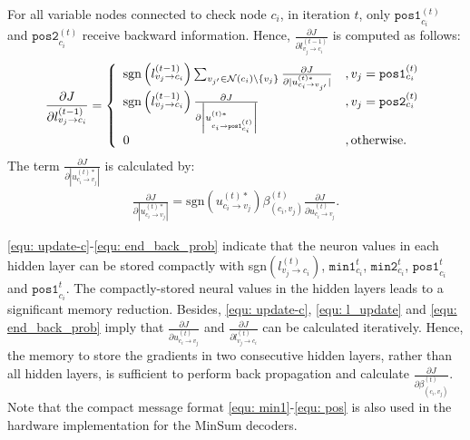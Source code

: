 \documentclass [PhD] {uclathes}
\begin{document}
For all variable nodes connected to check node $c_i$,  in iteration $t$, only $\texttt{pos1}^{(t)}_{c_i}$ and $\texttt{pos2}^{(t)}_{c_i}$ receive backward information. Hence, $\frac{\partial J}{\partial l^{(t-1)}_{v_j\rightarrow c_i}}$ is computed as follows:
\begin{align}
\label{equ: l_update}
    \frac{\partial J}{\partial l^{(t-1)}_{v_j\rightarrow c_i}} = \left\{ \begin{array}{l l} \text{sgn}\left(l^{(t-1)}_{v_j\rightarrow c_i}\right)\sum_{v_{j'}\in \mathcal{N}
    (c_i)\setminus \{v_j\}} \frac{\partial J}{\partial |{u^{(t)*}_{c_i \rightarrow v_{j'}}} |} & , v_j = \texttt{pos1}^{(t)}_{c_i}   \\ \text{sgn}\left(l^{(t-1)}_{v_j\rightarrow c_i}\right) \frac{\partial J}{\partial \left|{u^{(t)*}_{ c_i \rightarrow  \texttt{pos1}^{(t)}_{c_i}}} \right|}  &  , v_j = \texttt{pos2}^{(t)}_{c_i} \\  0 & , \text{otherwise}  . \\ \end{array} \right. 
\end{align} 
The term $\frac{\partial J}{\partial |{u^{(t)*}_{c_i \rightarrow v_j}} |}$ is calculated by:
\begin{align}\label{equ: end_back_prob}
    \frac{\partial J}{\partial |{u^{(t)*}_{c_i \rightarrow v_j}} |}= \text{sgn}(u^{(t)*}_{c_i \rightarrow v_j}) \beta_{(c_i,v_j)}^{(t)}\frac{\partial J}{\partial {u^{(t)}_{c_i \rightarrow v_j}} }.
\end{align}

\eqref{equ: update-c}-\eqref{equ: end_back_prob} indicate that the neuron values in each hidden layer can be stored compactly with sgn$\left(l^{(t)}_{v_j \rightarrow c_i}\right)$, $\texttt{min1}^{t}_{c_i}$, $\texttt{min2}^{t}_{c_i}$, $\texttt{pos1}^{t}_{c_i}$ and $\texttt{pos1}^{t}_{c_i}$. The compactly-stored neural values in the hidden layers leads to a significant memory reduction.  Besides,  \eqref{equ: update-c}, \eqref{equ: l_update} and \eqref{equ: end_back_prob} imply that $\frac{\partial J}{\partial {u^{(t)}_{c_i \rightarrow v_j}} }$ and $\frac{\partial J}{\partial l^{(t)}_{v_j\rightarrow c_i}}$  can be calculated iteratively.  
Hence, the memory to store the gradients in two consecutive hidden layers, rather than all hidden layers, is sufficient to perform back propagation and calculate $\frac{\partial J}{\partial \beta^{(t)}_{(c_i,v_j)}}$. Note that the compact message format \eqref{equ: min1}-\eqref{equ: pos} is also used in the hardware implementation for the MinSum decoders.
\end{document}
